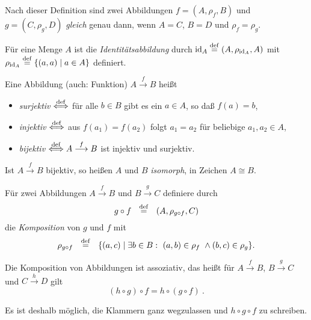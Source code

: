 Nach dieser Definition sind
zwei Abbildungen $f=(A,\rho_f,B)$ und $g=(C,\rho_g,D)$ \emph{gleich} genau
dann, wenn $A=C$, $B=D$ und $\rho_f=\rho_g$.

\begin{definition} 
 Für eine Menge $A$ ist die \emph{Identitätsabbildung} 
   durch $\textrm{id}_A \stackrel{\rm def}{=} (A,\rho_{\textrm{id}_A},A)$ mit $\rho_{\textrm{id}_A}
   \stackrel{\rm def}{=} \{(a,a)\mid a \in A\}$ definiert.
\end{definition}

\begin{definition}
Eine Abbildung (auch: Funktion) $A \stackrel{f}{\longrightarrow} B$ heißt
    \begin{itemize}
    \item \emph{surjektiv} $\stackrel{\rm def}{\Longleftrightarrow}$ für alle $b\in B$ gibt es ein $a\in A$, so daß $f(a)=b$,
    \item \emph{injektiv} $\stackrel{\rm def}{\Longleftrightarrow}$ aus $f(a_1) = f(a_2)$ folgt
          $a_1 = a_2$ für beliebige $a_1,a_2 \in A$,
    \item \emph{bijektiv} $\stackrel{\rm def}{\Longleftrightarrow} A \stackrel{f}{\longrightarrow} B$
      ist injektiv und surjektiv.
    \end{itemize}
    Ist $A \stackrel{f}{\longrightarrow} B$ bijektiv, so heißen $A$ und $B$
    \emph{isomorph}, in Zeichen $A \cong B$.

\end{definition}

\begin{definition}
    Für zwei Abbildungen $A \stackrel{f}{\longrightarrow} B$ und
    $B \stackrel{g}{\longrightarrow} C$ definiere durch
    \[ g \circ f\ \ \deq\ \ (A,\rho_{g \circ f},C)\]
     die \emph{Komposition}
    von $g$ und $f$  mit
    \[ \rho_{g \circ f}\ \ \stackrel{\rm def}{=}\ \ \{(a,c)\mid \exists b \in B:\
         (a,b) \in \rho_f\ \wedge (b,c) \in \rho_g\} .\]
\end{definition}

\begin{lemma} Die Komposition von Abbildungen ist assoziativ, das heißt
   für $A \stackrel{f}{\longrightarrow} B$, $B \stackrel{g}{\longrightarrow} C$
   und $C \stackrel{h}{\longrightarrow} D$ gilt
   \[ (h \circ g) \circ f = h \circ (g \circ f)\ .\]
\end{lemma}
Es ist deshalb möglich, die Klammern ganz wegzulassen und $h \circ g \circ f$
zu  schreiben.

